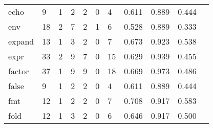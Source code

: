 \begin{longtable}{lp{1.10cm}p{1.10cm}p{1.10cm}p{1.10cm}p{1.10cm}p{1.10cm}p{1.10cm}p{1.10cm}p{1.10cm}p{1.10cm}}
echo      &                      9 &                                  1 &                                 2 &                                2 &                                 0 &                               4 &                          0.611 &                                 0.889 &                               0.444 \\
env       &                     18 &                                  2 &                                 7 &                                2 &                                 1 &                               6 &                          0.528 &                                 0.889 &                               0.333 \\
expand    &                     13 &                                  1 &                                 3 &                                2 &                                 0 &                               7 &                          0.673 &                                 0.923 &                               0.538 \\
expr      &                     33 &                                  2 &                                 9 &                                7 &                                 0 &                              15 &                          0.629 &                                 0.939 &                               0.455 \\
factor    &                     37 &                                  1 &                                 9 &                                9 &                                 0 &                              18 &                          0.669 &                                 0.973 &                               0.486 \\
false     &                      9 &                                  1 &                                 2 &                                2 &                                 0 &                               4 &                          0.611 &                                 0.889 &                               0.444 \\
fmt       &                     12 &                                  1 &                                 2 &                                2 &                                 0 &                               7 &                          0.708 &                                 0.917 &                               0.583 \\
fold      &                     12 &                                  1 &                                 3 &                                2 &                                 0 &                               6 &                          0.646 &                                 0.917 &                               0.500 \\

\end{longtable}
